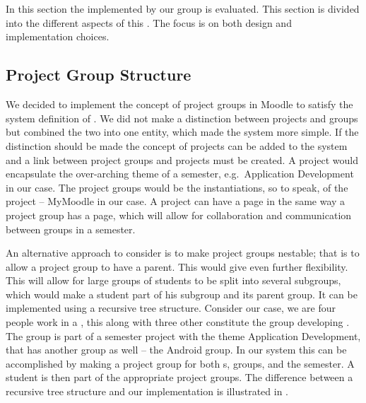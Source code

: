 \section{\administrationgroup{}}
\label{sec:productsubsystem}
In this section the \subsystem{} implemented by our group is evaluated. 
This section is divided into the different aspects of this \subsystem{}.
The focus is on both design and implementation choices.

\subsection{Project Group Structure}
We decided to implement the concept of project groups in Moodle to satisfy the system definition of \system{}.
We did not make a distinction between projects and groups but combined the two into one entity, which made the system more simple. 
If the distinction should be made the concept of projects can be added to the system and a link between project groups and projects must be created.
A project would encapsulate the over-arching theme of a semester, e.g.\ Application Development in our case.
The project groups would be the instantiations, so to speak, of the project -- MyMoodle in our case.
A project can have a page in the same way a project group has a page, which will allow for collaboration and communication between groups in a semester. 

An alternative approach to consider is to make project groups nestable; that is to allow a project group to have a parent.
This would give even further flexibility.
This will allow for large groups of students to be split into several subgroups, which would make a student part of his subgroup and its parent group.
It can be implemented using a recursive tree structure.
Consider our case, we are four people work in a \subgroup{}, this \subgroup{} along with three other constitute the group developing \system{}.
The \system{} group is part of a semester project with the theme Application Development, that has another group as well -- the Android group.
In our system this can be accomplished by making a project group for both \subgroup{}s, groups, and the semester.
A student is then part of the appropriate project groups.
The difference between a recursive tree structure and our implementation is illustrated in .



